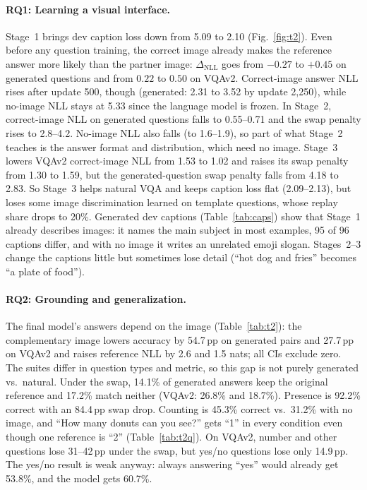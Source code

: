\documentclass{article}
\newcommand{\pp}{\,pp}
\begin{document}
\paragraph{RQ1: Learning a visual interface.} Stage~1 brings dev caption loss down from 5.09 to 2.10 (Fig.~\ref{fig:t2}). Even before any question training, the correct image already makes the reference answer more likely than the partner image: $\Delta_\text{NLL}$ goes from $-0.27$ to $+0.45$ on generated questions and from $0.22$ to $0.50$ on VQAv2. Correct-image answer NLL rises after update 500, though (generated: 2.31 to 3.52 by update 2{,}250), while no-image NLL stays at 5.33 since the language model is frozen. In Stage~2, correct-image NLL on generated questions falls to 0.55--0.71 and the swap penalty rises to 2.8--4.2. No-image NLL also falls (to 1.6--1.9), so part of what Stage~2 teaches is the answer format and distribution, which need no image. Stage~3 lowers VQAv2 correct-image NLL from 1.53 to 1.02 and raises its swap penalty from 1.30 to 1.59, but the generated-question swap penalty falls from 4.18 to 2.83. So Stage~3 helps natural VQA and keeps caption loss flat (2.09--2.13), but loses some image discrimination learned on template questions, whose replay share drops to 20\%. Generated dev captions (Table~\ref{tab:caps}) show that Stage~1 already describes images: it names the main subject in most examples, 95 of 96 captions differ, and with no image it writes an unrelated emoji slogan. Stages~2--3 change the captions little but sometimes lose detail (``hot dog and fries'' becomes ``a plate of food'').

\paragraph{RQ2: Grounding and generalization.} The final model's answers depend on the image (Table~\ref{tab:t2}): the complementary image lowers accuracy by 54.7\pp{} on generated pairs and 27.7\pp{} on VQAv2 and raises reference NLL by 2.6 and 1.5 nats; all CIs exclude zero. The suites differ in question types and metric, so this gap is not purely generated vs.\ natural. Under the swap, 14.1\% of generated answers keep the original reference and 17.2\% match neither (VQAv2: 26.8\% and 18.7\%). Presence is 92.2\% correct with an 84.4\pp{} swap drop. Counting is 45.3\% correct vs.\ 31.2\% with no image, and ``How many donuts can you see?'' gets ``1'' in every condition even though one reference is ``2'' (Table~\ref{tab:t2q}). On VQAv2, number and other questions lose 31--42\pp{} under the swap, but yes/no questions lose only 14.9\pp. The yes/no result is weak anyway: always answering ``yes'' would already get 53.8\%, and the model gets 60.7\%.
\end{document}
